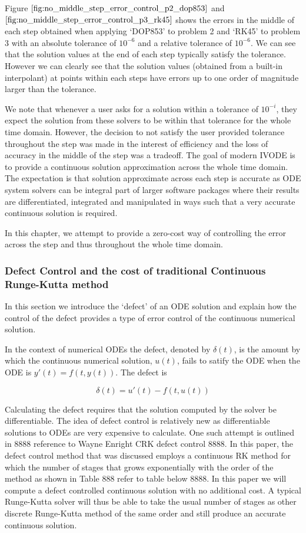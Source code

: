 \documentclass{article}
\begin{document}
Figure $\ref{fig:no_middle_step_error_control_p2_dop853}$ and $\ref{fig:no_middle_step_error_control_p3_rk45}$ shows the errors in the middle of each step obtained when applying `DOP853' to problem 2 and `RK45' to problem 3 with an absolute tolerance of $10^{-6}$ and a relative tolerance of $10^{-6}$. We can see that the solution values at the end of each step typically satisfy the tolerance. However we can clearly see that the solution values (obtained from a built-in interpolant) at points within each steps have errors up to one order of magnitude larger than the tolerance. 

We note that whenever a user asks for a solution within a tolerance of $10^{-i}$, they expect the solution from these solvers to be within that tolerance for the whole time domain. However, the decision to not satisfy the user provided tolerance throughout the step was made in the interest of efficiency and the loss of accuracy in the middle of the step was a tradeoff. The goal of modern IVODE is to provide a continuous solution approximation across the whole time domain. The expectation is that solution approximate across each step is accurate as ODE system solvers can be integral part of larger software packages where their results are differentiated, integrated and manipulated in ways such that a very accurate continuous solution is required. 

In this chapter, we attempt to provide a zero-cost way of controlling the error across the step and thus throughout the whole time domain.

\subsubsection{Defect Control and the cost of traditional Continuous Runge-Kutta method}
\label{section:crk_related_work}
In this section we introduce the `defect' of an ODE solution and explain how the control of the defect provides a type of error control of the continuous numerical solution.

In the context of numerical ODEs the defect, denoted by $\delta(t)$,  is the amount by which the continuous numerical solution, $u(t)$, fails to satify the ODE when the ODE is $y'(t) = f(t, y(t))$. The defect is 

\begin{equation}
\delta(t) = u'(t) - f(t, u(t))
\end{equation}

Calculating the defect requires that the solution computed by the solver be differentiable. The idea of defect control is relatively new as differentiable solutions to ODEs are very expensive to calculate. One such attempt is outlined in 8888 reference to Wayne Enright CRK defect control 8888. In this paper, the defect control method that was discussed employs a continuous RK method for which the number of stages that grows exponentially with the order of the method as shown in Table 888 refer to table below 8888. In this paper we will compute a defect controlled continuous solution with no additional cost. A typical Runge-Kutta solver will thus be able to take the usual number of stages as other discrete Runge-Kutta method of the same order and still produce an accurate continuous solution.
\end{document}
